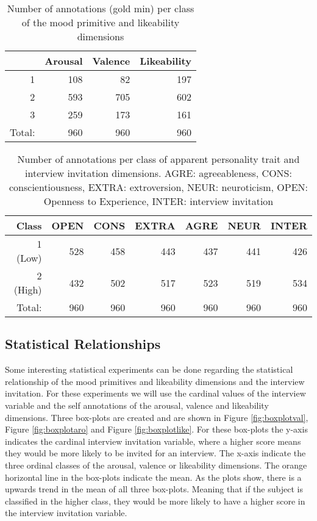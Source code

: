 \begin{table}[h]
\begin{tabular}{|r|r|r|r|}
\hline
\rowcolor{Gray} 
\multicolumn{1}{|l|}{Class} &
  \multicolumn{1}{l|}{Arousal} &
  \multicolumn{1}{l|}{Valence} &
  \multicolumn{1}{l|}{Likeability} \\ \hline
1                           & 108 & 82  & 197 \\ \hline
2                           & 593 & 705 & 602 \\ \hline
3                           & 259 & 173 & 161 \\ \hline
\multicolumn{1}{|l|}{Total:} & 960 & 960 & 960 \\ \hline
\end{tabular}
\caption{Number of annotations (gold min) per class of the mood primitive and likeability dimensions}
\label{tab:goldcount}
\end{table}

\begin{table*}[h]
\begin{tabular}{|r|r|r|r|r|r|r|}
\hline
\rowcolor{Gray} Class &
  \multicolumn{1}{l|}{OPEN} & 
  \multicolumn{1}{l|}{CONS} &
  \multicolumn{1}{l|}{EXTRA} &
  \multicolumn{1}{l|}{AGRE} &
  \multicolumn{1}{l|}{NEUR} &
  \multicolumn{1}{l|}{INTER} \\ \hline
1 (Low)    & 528 & 458 & 443 & 437 & 441 & 426 \\ \hline
2 (High)    & 432 & 502 & 517 & 523 & 519 & 534 \\ \hline
Total: & 960 & 960 & 960 & 960 & 960 & 960 \\ \hline
\end{tabular}
\caption{Number of annotations per class of apparent personality trait and interview invitation dimensions. AGRE: agreeableness, CONS: conscientiousness, EXTRA: extroversion, NEUR: neuroticism, OPEN: Openness to Experience, INTER: interview invitation}
\label{tab:personcount}
\end{table*}

\subsection{Statistical Relationships}

Some interesting statistical experiments can be done regarding the statistical relationship of the mood primitives and likeability dimensions and the interview invitation. For these experiments we will use the cardinal values of the interview variable and the self annotations of the arousal, valence and likeability dimensions. Three box-plots are created and are shown in Figure \ref{fig:boxplotval}, Figure \ref{fig:boxplotaro} and Figure \ref{fig:boxplotlike}. For these box-plots the y-axis indicates the cardinal interview invitation variable, where a higher score means they would be more likely to be invited for an interview. The x-axis indicate the three ordinal classes of the arousal, valence or likeability dimensions. The orange horizontal line in the box-plots indicate the mean. As the plots show, there is a upwards trend in the mean of all three box-plots. Meaning that if the subject is classified in the higher class, they would be more likely to have a higher score in the interview invitation variable.

